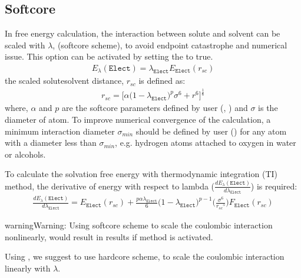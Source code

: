 \documentclass[letterpaper,10pt,english]{sphinxmanual}
\begin{document}
\subsection{Soft\sphinxhyphen{}core}
\label{\detokenize{free_energy:id1}}
In free energy calculation, the  interaction between solute and solvent can be scaled with \(\lambda\),  (soft\sphinxhyphen{}core scheme), to avoid
end\sphinxhyphen{}point catastrophe and numerical issue. This option can be activated by setting the  to true.
\begin{equation*}
\begin{split}E_{\lambda}(\texttt{Elect}) = \lambda_{\texttt{Elect}} E_{\texttt{Elect}}(r_{sc})\end{split}
\end{equation*}
the scaled solute\sphinxhyphen{}solvent distance, \(r_{sc}\) is defined as:
\begin{equation*}
\begin{split}r_{sc} = \bigg[\alpha {\big(1 - \lambda_{\texttt{Elect}} \big)}^{p}{\sigma}^6 + {r}^6 \bigg]^{\frac{1}{6}}\end{split}
\end{equation*}
where, \(\alpha\) and \(p\) are the soft\sphinxhyphen{}core parameters defined by user (, ) and \(\sigma\) is the diameter of atom.
To improve numerical convergence of the calculation, a minimum interaction diameter \(\sigma_{min}\) should be defined by user () for any atom with a diameter
less than \(\sigma_{min}\), e.g. hydrogen atoms attached to oxygen in water or alcohols.

To calculate the solvation free energy with thermodynamic integration (TI) method, the derivative of energy with
respect to lambda (\(\frac{dE_{\lambda}(\texttt{Elect})}{d\lambda_{\texttt{Elect}}}\)) is required:
\begin{equation*}
\begin{split}\frac{dE_{\lambda}(\texttt{Elect})}{d\lambda_{\texttt{Elect}}} = E_{\texttt{Elect}}(r_{sc}) + \frac{p \alpha \lambda_{\texttt{Elect}}}{6} \bigg(1 - \lambda_{\texttt{Elect}}\bigg)^{p-1} \bigg(\frac{{\sigma}^6}{{r_{sc}}^5} \bigg) F_{\texttt{Elect}}(r_{sc})\end{split}
\end{equation*}
\begin{sphinxadmonition}{warning}{Warning:}
Using soft\sphinxhyphen{}core scheme to scale the coulombic interaction non\sphinxhyphen{}linearly, would result in  results if  method is activated.

Using , we suggest to use hard\sphinxhyphen{}core scheme, to scale the coulombic interaction linearly with \(\lambda\).
\end{sphinxadmonition}
\end{document}
